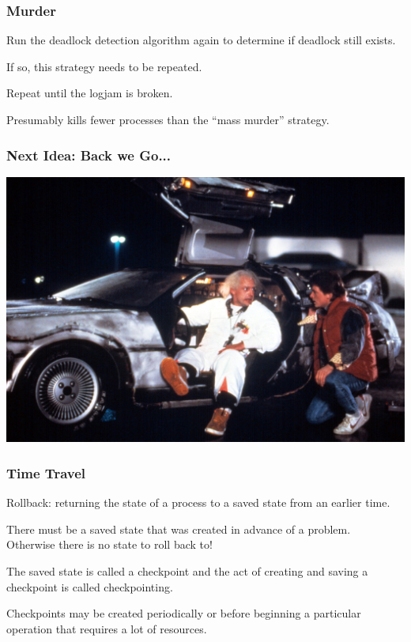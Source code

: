 \begin{frame}
	\frametitle{Murder}
	Run the deadlock detection algorithm again to determine if deadlock still exists.

	If so, this strategy needs to be repeated.

	Repeat until the logjam is broken.

	Presumably kills fewer processes than the ``mass murder'' strategy.

\end{frame}


\begin{frame}
	\frametitle{Next Idea: Back we Go...}

	\begin{center}
		\includegraphics[width=\textwidth]{images/bttf.jpg}
	\end{center}

\end{frame}


\begin{frame}
	\frametitle{Time Travel}

	\alert{Rollback}: returning the state of a process to a saved state from an earlier time.

	There must be a saved state that was created in advance of a problem. \\
	\quad Otherwise there is no state to roll back to!

	The saved state is called a \alert{checkpoint} and the act of creating and saving a checkpoint is called \alert{checkpointing}.

	Checkpoints may be created periodically or before beginning a particular operation that requires a lot of resources.

\end{frame}

